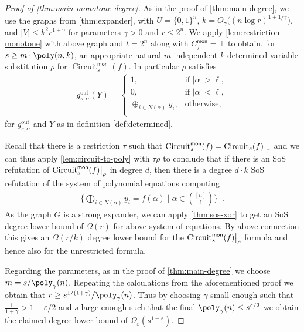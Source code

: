 \documentclass[10pt,a4paper]{article}
\theoremstyle{plain}
\theoremstyle{remark}
\theoremstyle{definition}
\newcommand{\eps}{\varepsilon}
\newcommand{\eqperiod}{\enspace .}
\newcommand{\set}[1]{\{#1\}}
\newcommand\restrict[2]{{%
  \left.\kern-\nulldelimiterspace %
  #1 %
  \vphantom{\big|} %
  \right|_{#2} %
  }}
\newcommand{\mon}{{\mathsf{mon}}}
\newcommand{\gout}{g^\mathrm{out}}
\DeclareMathOperator{\circuit}{Circuit}
\begin{document}
\begin{proof}[Proof of \cref{thm:main-monotone-degree}]
  As in the proof of \cref{thm:main-degree}, we use the graphs from
  \cref{thm:expander}, with $U = \{0,1\}^n$,
  $k = O_{\gamma}\big((n \log r)^{1 + 1/\gamma}\big)$, and
  $|V| \le k^2 r^{1+\gamma}$ for parameters $\gamma > 0$ and
  $r \le 2^n$. We apply \cref{lem:restriction-monotone} with above
  graph and $t=2^n$ along with $C_f^\mon = \bot$ to obtain, for
  $s \ge m \cdot \poly(n, k)$, an appropriate natural $m$-independent
  $k$-determined variable substitution $\rho$ for
  $\circuit^\mon_s(f)$. In particular $\rho$ satisfies
  \begin{align*}
    \gout_{s, \alpha}(Y) =
    \begin{cases}
      1, &\text{if~} |\alpha| > \ell,\\
      0, &\text{if~} |\alpha| < \ell,\\
      \oplus_{i \in N(\alpha)} y_i, &\text{otherwise},\\
    \end{cases}
  \end{align*}
  for $\gout_{s, \alpha}$ and $Y$ as in definition
  \cref{def:determined}.

  Recall that there is a restriction $\tau$ such that
  $\circuit_s^\mon(f) = \restrict{\circuit_s(f)}{\tau}$ and we can
  thus apply \cref{lem:circuit-to-poly} with $\tau\rho$ to conclude
  that if there is an SoS refutation of
  $\restrict{\circuit^\mon_s(f)}{\rho}$ in degree $d$, then there is a
  degree $d \cdot k$ SoS refutation of the system of polynomial
  equations computing
  \begin{align}
    \set{
    \bigoplus_{i \in N(\alpha)} y_i = f(\alpha)
    \mid
    \alpha \in \binom{[n]}{\ell}
    }
    \eqperiod
  \end{align}
  As the graph $G$ is a strong expander, we can apply
  \cref{thm:sos-xor} to get an SoS degree lower bound of $\Omega(r)$
  for above system of equations. By above connection this gives an
  $\Omega(r/k)$ degree lower bound for the
  $\restrict{\circuit^\mon_s(f)}{\rho}$ formula and hence also for the
  unrestricted formula.

  Regarding the parameters, as in the proof of \cref{thm:main-degree}
  we choose $m = s/\poly_\gamma(n)$. Repeating the
  calculations from the aforementioned proof we obtain that
  $r \ge s^{1/(1+\gamma)}/\poly_\gamma(n)$. Thus by choosing
  $\gamma$ small enough such that $\frac{1}{1 + \gamma} > 1 - \eps/2$
  and $s$ large enough such that the final
  $\poly_\gamma(n) \le s^{\eps/2}$ we obtain the claimed degree lower
  bound of $\Omega_\eps(s^{1-\eps})$.
\end{proof}
\end{document}
